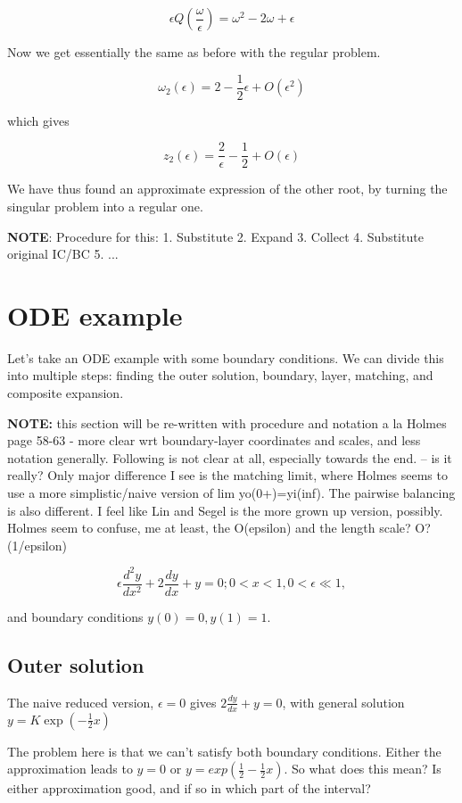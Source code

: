 \documentclass[12pt]{report}
\begin{document}
$$\epsilon Q(\frac \omega \epsilon) = \omega^2 - 2\omega + \epsilon$$

Now we get essentially the same as before with the regular problem.

$$\omega_2(\epsilon) = 2 - \frac 1 2 \epsilon + O(\epsilon^2)$$

which gives

$$z_2(\epsilon) = \frac 2 \epsilon - \frac 1 2 + O(\epsilon)$$

We have thus found an approximate expression of the other root, by
turning the singular problem into a regular one.

\textbf{NOTE}:  Procedure for this:
1. Substitute 2. Expand 3. Collect 4. Substitute original IC/BC 5. ...

\section{ODE example}

Let's take an ODE example with some boundary conditions. We can divide this into multiple steps: finding the outer solution, boundary, layer, matching, and composite expansion.

\textbf{NOTE:} this section will be re-written with procedure and
notation a la Holmes page 58-63 - more clear wrt boundary-layer
coordinates and scales, and less notation generally. Following is not
clear at all, especially towards the end. -- is it really? Only major difference I see is the matching limit, where Holmes seems to use a more simplistic/naive version of lim yo(0+)=yi(inf). The pairwise balancing is also different. I feel like Lin and Segel is the more grown up version, possibly. Holmes seem to confuse, me at least, the O(epsilon) and the length scale? O?(1/epsilon)

\begin{equation}
  \epsilon \frac{d^2y}{dx^2} + 2 \frac{dy}{dx} + y = 0; 0 < x < 1, 0
  < \epsilon \ll 1,
\end{equation}

and boundary conditions $y(0)=0, y(1) =1$.

\subsection{Outer solution}

The naive reduced version, $\epsilon = 0$ gives $2 \frac{dy}{dx} + y =
0$, with general solution $y=K \exp(-\frac{1}{2} x)$

The problem here is that we can't satisfy both boundary
conditions. Either the approximation leads to $y=0$ or $y=exp(\frac 1
2 - \frac 1 2 x)$. So what does this mean? Is either approximation
good, and if so in which part of the interval?
\end{document}

